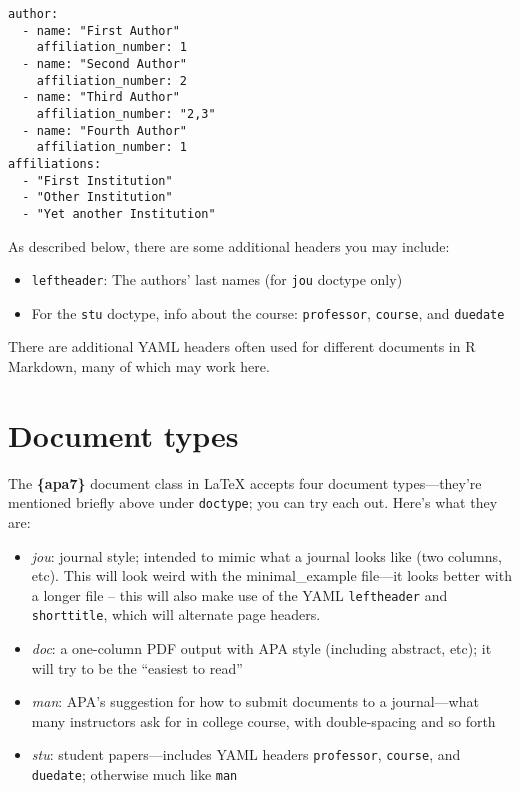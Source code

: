 \documentclass[jou]{apa7}
\providecommand{\tightlist}{%
  \setlength{\itemsep}{0pt}\setlength{\parskip}{0pt}}
\begin{document}
\begin{verbatim}
author: 
  - name: "First Author"
    affiliation_number: 1
  - name: "Second Author"
    affiliation_number: 2
  - name: "Third Author"
    affiliation_number: "2,3"
  - name: "Fourth Author"
    affiliation_number: 1
affiliations:
  - "First Institution"
  - "Other Institution"
  - "Yet another Institution"
\end{verbatim}

As described below, there are some additional headers you may include:

\begin{itemize}
\tightlist
\item
  \texttt{leftheader}: The authors' last names (for \texttt{jou} doctype
  only)
\item
  For the \texttt{stu} doctype, info about the course:
  \texttt{professor}, \texttt{course}, and \texttt{duedate}
\end{itemize}

There are additional YAML headers often used for different documents in
R Markdown, many of which may work here.

\hypertarget{document-types}{%
\section{Document types}\label{document-types}}

The \textbf{\{apa7\}} document class in LaTeX accepts four document
types---they're mentioned briefly above under \texttt{doctype}; you can
try each out. Here's what they are:

\begin{itemize}
\tightlist
\item
  \emph{jou}: journal style; intended to mimic what a journal looks like
  (two columns, etc). This will look weird with the minimal\_example
  file---it looks better with a longer file -- this will also make use
  of the YAML \texttt{leftheader} and \texttt{shorttitle}, which will
  alternate page headers.
\item
  \emph{doc}: a one-column PDF output with APA style (including
  abstract, etc); it will try to be the ``easiest to read''
\item
  \emph{man}: APA's suggestion for how to submit documents to a
  journal---what many instructors ask for in college course, with
  double-spacing and so forth
\item
  \emph{stu}: student papers---includes YAML headers \texttt{professor},
  \texttt{course}, and \texttt{duedate}; otherwise much like
  \texttt{man}
\end{itemize}
\end{document}
